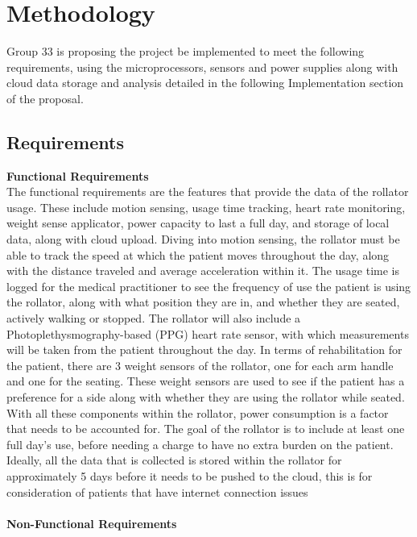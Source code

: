 \documentclass{article}
\begin{document}
\section{Methodology}
Group 33 is proposing the project be implemented to meet the following requirements, using the microprocessors, sensors and power supplies along with cloud data storage and analysis detailed in the following Implementation section of the proposal.

\subsection{Requirements}
\textbf{Functional Requirements} \\
The functional requirements are the features that provide the data of the rollator usage. These include motion sensing, usage time tracking, heart rate monitoring, weight sense applicator, power capacity to last a full day, and storage of local data, along with cloud upload.
Diving into motion sensing, the rollator must be able to track the speed at which the patient moves throughout the day, along with the distance traveled and average acceleration within it. The usage time is logged for the medical practitioner to see the frequency of use the patient is using the rollator, along with what position they are in, and whether they are seated, actively walking or stopped. The rollator will also include a Photoplethysmography-based (PPG) heart rate sensor, with which measurements will be taken from the patient throughout the day.
In terms of rehabilitation for the patient, there are 3 weight sensors of the rollator, one for each arm handle and one for the seating. These weight sensors are used to see if the patient has a preference for a side along with whether they are using the rollator while seated. With all these components within the rollator, power consumption is a factor that needs to be accounted for. The goal of the rollator is to include at least one full day's use, before needing a charge to have no extra burden on the patient. Ideally, all the data that is collected is stored within the rollator for approximately 5 days before it needs to be pushed to the cloud, this is for consideration of patients that have internet connection issues \\\\
\textbf{Non-Functional Requirements} \\
\end{document}
